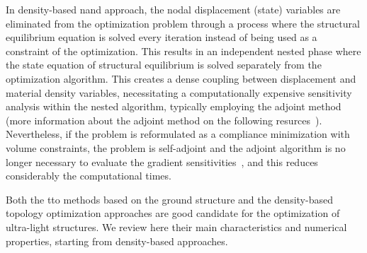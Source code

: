 In density-based \acrfull{nand} approach, the nodal displacement (state) variables are eliminated from the optimization problem through a process where the structural equilibrium equation is solved every iteration instead of being used as a constraint of the optimization. This results in an independent nested phase where the state equation of structural equilibrium is solved separately from the optimization algorithm. This creates a dense coupling between displacement and material density variables, necessitating a computationally expensive sensitivity analysis within the nested algorithm, typically employing the adjoint method (more information about the adjoint method on the following resurces~). Nevertheless, if the problem is reformulated as a compliance minimization with volume constraints, the problem is self-adjoint and the adjoint algorithm is no longer necessary to evaluate the gradient sensitivities~, and this reduces considerably the computational times.

Both the \gls{tto} methods based on the ground structure and the density-based topology optimization approaches are good candidate for the optimization of ultra-light structures. We review here their main characteristics and numerical properties, starting from density-based approaches.


